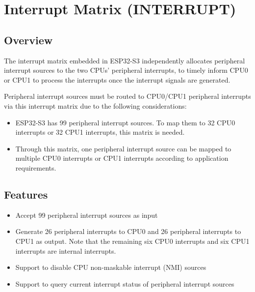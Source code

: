 \documentclass[main\_\_EN.tex]{subfiles}
\begin{document}

\ifglobal
\else
    {\let\clearpage\relax \listoftodos}
    \tableofcontents
\fi



\hypertarget{intmtrx}{}
\chapter{Interrupt Matrix (INTERRUPT)}
\label{mod:intmtrx}

\section{Overview}

The interrupt matrix embedded in ESP32-S3 independently allocates peripheral interrupt sources to the two CPUs' peripheral interrupts, to timely inform CPU0 or CPU1 to process the interrupts once the interrupt signals are generated.

Peripheral interrupt sources must be routed to CPU0/CPU1 peripheral interrupts via this interrupt matrix due to the following considerations:
\begin{itemize}
    \item ESP32-S3 has 99 peripheral interrupt sources. To map them to 32 CPU0 interrupts or 32 CPU1 interrupts, this matrix is needed.
    \item Through this matrix, one peripheral interrupt source can be mapped to multiple CPU0 interrupts or CPU1 interrupts according to application requirements.
\end{itemize}

\section{Features}

\begin{itemize}
    \item Accept 99 peripheral interrupt sources as input
    \item Generate 26 peripheral interrupts to CPU0 and 26 peripheral interrupts to CPU1 as output. Note that the remaining six CPU0 interrupts and six CPU1 interrupts are internal interrupts.
    \item Support to disable CPU non-maskable interrupt (NMI) sources
    \item Support to query current interrupt status of peripheral interrupt sources
\end{itemize}
\end{document}
